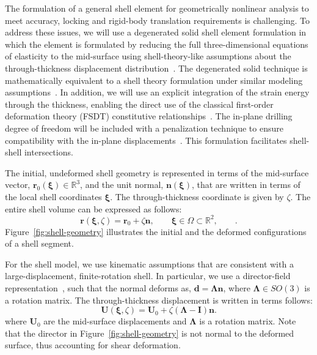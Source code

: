 \documentclass[]{aiaa-tc}
\newcommand{\mb}{\mathbf}
\newcommand{\mbs}{\boldsymbol}
\begin{document}
The formulation of a general shell element for geometrically nonlinear
analysis to meet accuracy, locking and rigid-body translation
requirements is challenging. To address these issues, we will use a
degenerated solid shell element formulation in which the element is
formulated by reducing the full three-dimensional equations of
elasticity to the mid-surface using shell-theory-like assumptions
about the through-thickness displacement
distribution~\cite{Ahmad:1970:ATS, Bathe:1980:GMN, Parisch:1978:GNA,
  Hughes:1981:NFE}.  The degenerated solid technique is mathematically
equivalent to a shell theory formulation under similar modeling
assumptions~\cite{Buechter:1992:STD}. In addition, we will use an
explicit integration of the strain energy through the thickness,
enabling the direct use of the classical first-order deformation
theory (FSDT) constitutive relationships~\cite{Milford:1986:DIF,
  Buechter:1992:STD}. The in-plane drilling degree of freedom will be
included with a penalization technique to ensure compatibility with
the in-plane displacements~\cite{Hughes:1989:DDF, Simo:1992:FFE,
  Fox:1992:DRF}. This formulation facilitates shell-shell
intersections.

The initial, undeformed shell geometry is represented in terms of the
mid-surface vector, $\mb{r}_{0}(\mbs{\xi}) \in \mathbb{R}^{3}$, and
the unit normal, $\mb{n}(\mbs{\xi})$, that are written in terms of the
local shell coordinates $\mbs{\xi}$. The through-thickness coordinate
is given by $\zeta$. The entire shell volume can be expressed as
follows:
%
\begin{equation} 
  \mb{r}(\mbs{\xi}, \zeta) = 
  \mb{r}_{0} + \zeta \mb{n}, 
  \qquad \mbs{\xi} \in \Omega \subset \mathbb{R}^{2}, \qquad.
  \label{eqn:mid-surface}
\end{equation}
Figure~\ref{fig:shell-geometry} illustrates the initial and the deformed
configurations of a shell segment. 

For the shell model, we use kinematic assumptions that are consistent
with a large-displacement, finite-rotation shell. In particular, we
use a director-field representation~\cite{Simo:1989:SRG1}, such that
the normal deforms as, $\mb{d} = \mbs{\Lambda} \mb{n}$, where
$\mbs{\Lambda} \in SO(3)$ is a rotation matrix. The through-thickness
displacement is written in terms follows:
%
\begin{equation*}
  \label{eqn:displacement-field}
  \mb{U}(\mbs{\xi}, \zeta) = \mb{U}_{0} + \zeta (\mbs{\Lambda} - \mb{I}) \mb{n}.
\end{equation*}
where $\mb{U}_{0}$ are the mid-surface displacements and
$\mbs{\Lambda}$ is a rotation matrix. Note that the director in
Figure~\ref{fig:shell-geometry} is not normal to the deformed surface,
thus accounting for shear deformation.
\end{document}
